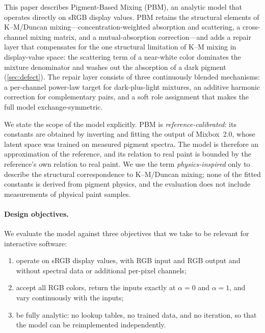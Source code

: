 This paper describes Pigment-Based Mixing (PBM), an analytic model that operates directly on sRGB display values. PBM retains the structural elements of K--M/Duncan mixing---concentration-weighted absorption and scattering, a cross-channel mixing matrix, and a mutual-absorption correction---and adds a repair layer that compensates for the one structural limitation of K--M mixing in display-value space: the scattering term of a near-white color dominates the mixture denominator and washes out the absorption of a dark pigment (\cref{sec:defect}). The repair layer consists of three continuously blended mechanisms: a per-channel power-law target for dark-plus-light mixtures, an additive harmonic correction for complementary pairs, and a soft role assignment that makes the full model exchange-symmetric.

We state the scope of the model explicitly. PBM is \emph{reference-calibrated}: its constants are obtained by inverting and fitting the output of Mixbox~2.0, whose latent space was trained on measured pigment spectra. The model is therefore an approximation of the reference, and its relation to real paint is bounded by the reference's own relation to real paint. We use the term \emph{physics-inspired} only to describe the structural correspondence to K--M/Duncan mixing; none of the fitted constants is derived from pigment physics, and the evaluation does not include measurements of physical paint samples.

\paragraph{Design objectives.}
We evaluate the model against three objectives that we take to be relevant for interactive software:
\begin{enumerate}[label=R\arabic*.,leftmargin=2.2em]
\item operate on sRGB display values, with RGB input and RGB output and without spectral data or additional per-pixel channels;
\item accept all RGB colors, return the inputs exactly at $\alpha=0$ and $\alpha=1$, and vary continuously with the inputs;
\item be fully analytic: no lookup tables, no trained data, and no iteration, so that the model can be reimplemented independently.
\end{enumerate}

